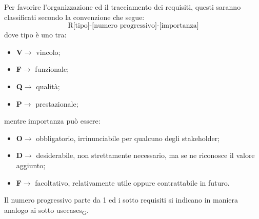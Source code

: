                 Per favorire l'organizzazione ed il tracciamento dei requisiti, questi saranno classificati secondo la convenzione che segue:
                $$\text{R[tipo]-[numero progressivo]-[importanza]}$$
                dove tipo è uno tra:
                \begin{itemize}
                    \item \textbf{V}$\rightarrow$ vincolo;
                    \item \textbf{F}$\rightarrow$ funzionale;
                    \item \textbf{Q}$\rightarrow$ qualità;
                    \item \textbf{P}$\rightarrow$ prestazionale;
                \end{itemize}
                mentre importanza può essere:
                \begin{itemize}
                    \item \textbf{O}$\rightarrow$ obbligatorio, irrinunciabile per qualcuno degli stakeholder;
                    \item \textbf{D}$\rightarrow$ desiderabile, non strettamente necessario, ma se ne riconosce il valore aggiunto;
                    \item \textbf{F}$\rightarrow$ facoltativo, relativamente utile oppure contrattabile in futuro.
                \end{itemize}
                Il numero progressivo parte da 1 ed i sotto requisiti si indicano in maniera analogo ai sotto \glspl{usecase}\textsubscript{G}.

